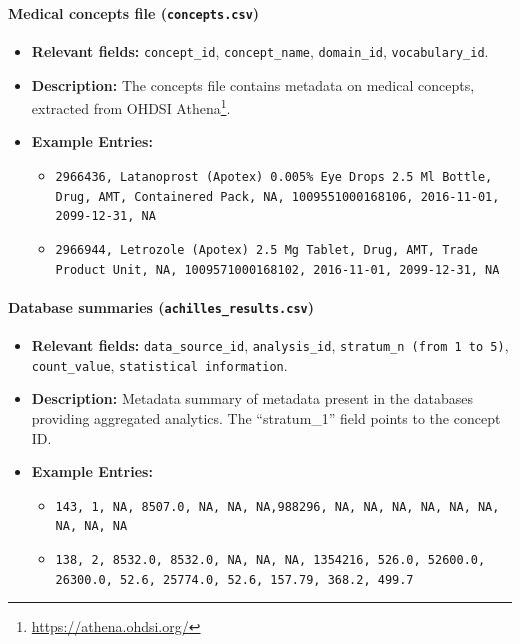 \paragraph{Medical concepts file {\small\normalfont(\texttt{concepts.csv})}}

\begin{itemize}
    \item {\raggedright\textbf{Relevant fields:}
    \texttt{concept\_id}, \texttt{concept\_name}, \texttt{domain\_id}, \texttt{vocabulary\_id}.\par}
    \item \textbf{Description:} The concepts file contains metadata on medical concepts, extracted from OHDSI Athena\footnote{\url{https://athena.ohdsi.org/}}.
    \item \textbf{Example Entries:}
    \begin{itemize}
        \item \texttt{2966436, Latanoprost (Apotex) 0.005\% Eye Drops 2.5 Ml Bottle, Drug, AMT, Containered Pack, NA, 1009551000168106, 2016-11-01, 2099-12-31, NA}
        \item \texttt{2966944, Letrozole (Apotex) 2.5 Mg Tablet, Drug, AMT, Trade Product Unit, NA, 1009571000168102, 2016-11-01, 2099-12-31, NA}
    \end{itemize}
\end{itemize}

\paragraph{Database summaries {\small\normalfont(\texttt{achilles\_results.csv})}}

\begin{itemize}
    \item {\raggedright\textbf{Relevant fields:} \texttt{data\_source\_id}, \texttt{analysis\_id}, \texttt{stratum\_n (from 1 to 5)}, \texttt{count\_value}, \texttt{statistical information}.\par}
    \item \textbf{Description:} Metadata summary of metadata present in the databases providing aggregated analytics. The “stratum\_1” field points to the concept ID. 
    \item \textbf{Example Entries:}
    \begin{itemize}
        \item \texttt{143, 1, NA, 8507.0, NA, NA, NA,988296, NA, NA, NA, NA, NA, NA, NA, NA, NA}
        \item \texttt{138, 2, 8532.0, 8532.0, NA, NA, NA, 1354216, 526.0, 52600.0, 26300.0, 52.6, 25774.0, 52.6, 157.79, 368.2, 499.7}
    \end{itemize}
\end{itemize}

